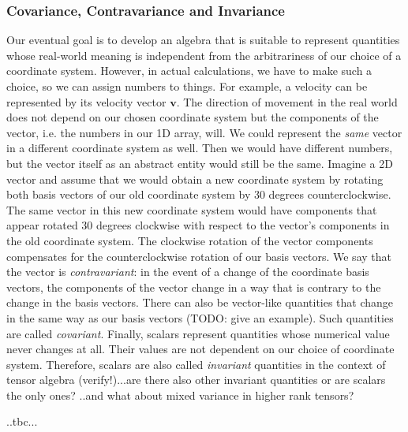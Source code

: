 \subsubsection{Covariance, Contravariance and Invariance}
Our eventual goal is to develop an algebra that is suitable to represent quantities whose real-world meaning is independent from the arbitrariness of our choice of a coordinate system. However, in actual calculations, we have to make such a choice, so we can assign numbers to things. For example, a velocity can be represented by its velocity vector $\mathbf{v}$. The direction of movement in the real world does not depend on our chosen coordinate system but the components of the vector, i.e. the numbers in our 1D array, will. We could represent the \emph{same} vector in a different coordinate system as well. Then we would have different numbers, but the vector itself as an abstract entity would still be the same. Imagine a 2D vector and assume that we would obtain a new coordinate system by rotating both basis vectors of our old coordinate system by 30 degrees counterclockwise. The same vector in this new coordinate system would have components that appear rotated 30 degrees clockwise with respect to the vector's components in the old coordinate system. The clockwise rotation of the vector components compensates for the counterclockwise rotation of our basis vectors. We say that the vector is \emph{contravariant}: in the event of a change of the coordinate basis vectors, the components of the vector change in a way that is contrary to the change in the basis vectors. There can also be vector-like quantities that change in the same way as our basis vectors (TODO: give an example). Such quantities are called \emph{covariant}. Finally, scalars represent quantities whose numerical value never changes at all. Their values are not dependent on our choice of coordinate system. Therefore, scalars are also called \emph{invariant} quantities in the context of tensor algebra (verify!)...are there also other invariant quantities or are scalars the only ones? ..and what about mixed variance in higher rank tensors?


..tbc...

